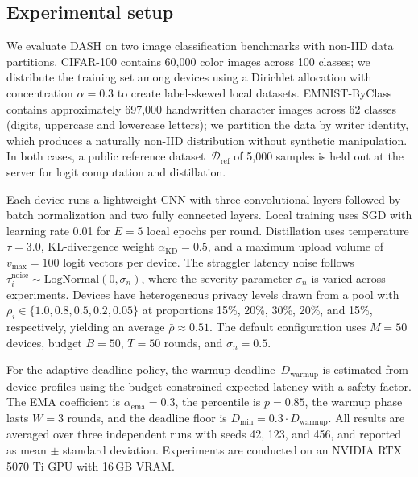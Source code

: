 \documentclass[a4paper,fleqn]{cas-dc}
\newcommand{\Dref}{\mathcal{D}_{\mathrm{ref}}}
\newcommand{\vmax}{v_{\max}}
\begin{document}
	\subsection{Experimental setup}\label{sec:setup}
	
	We evaluate DASH on two image classification benchmarks with
	non-IID data partitions.  CIFAR-100 contains 60,000 color images
	across 100 classes; we distribute the training set among devices
	using a Dirichlet allocation with concentration $\alpha = 0.3$ to
	create label-skewed local datasets.  EMNIST-ByClass contains
	approximately 697,000 handwritten character images across 62 classes
	(digits, uppercase and lowercase letters); we partition the data by
	writer identity, which produces a naturally non-IID distribution
	without synthetic manipulation.  In both cases, a public reference
	dataset~$\Dref$ of 5,000 samples is held out at the server for logit
	computation and distillation.
	
	Each device runs a lightweight CNN with three convolutional layers
	followed by batch normalization and two fully connected layers.
	Local training uses SGD with learning rate 0.01 for $E = 5$ local
	epochs per round.  Distillation uses temperature $\tau = 3.0$,
	KL-divergence weight $\alpha_{\mathrm{KD}} = 0.5$, and a maximum
	upload volume of $\vmax = 100$ logit vectors per device.  The
	straggler latency noise follows
	$\tau_i^{\mathrm{noise}} \sim \mathrm{LogNormal}(0, \sigma_n)$,
	where the severity parameter $\sigma_n$ is varied across
	experiments.  Devices have heterogeneous privacy levels drawn from a
	pool with $\rho_i \in \{1.0, 0.8, 0.5, 0.2, 0.05\}$ at proportions
	15\%, 20\%, 30\%, 20\%, and 15\%, respectively, yielding an average
	$\bar{\rho} \approx 0.51$.  The default configuration uses $M = 50$
	devices, budget $B = 50$, $T = 50$ rounds, and $\sigma_n = 0.5$.
	
	For the adaptive deadline policy, the warmup
	deadline~$D_{\mathrm{warmup}}$ is estimated from device profiles
	using the budget-constrained expected latency with a safety factor.
	The EMA coefficient is $\alpha_{\mathrm{ema}} = 0.3$, the percentile
	is $p = 0.85$, the warmup phase lasts $W = 3$ rounds, and the
	deadline floor is $D_{\min} = 0.3 \cdot D_{\mathrm{warmup}}$.  All
	results are averaged over three independent runs with seeds 42, 123,
	and 456, and reported as mean $\pm$ standard deviation.  Experiments
	are conducted on an NVIDIA RTX 5070 Ti GPU with 16\,GB VRAM.
	
\end{document}
